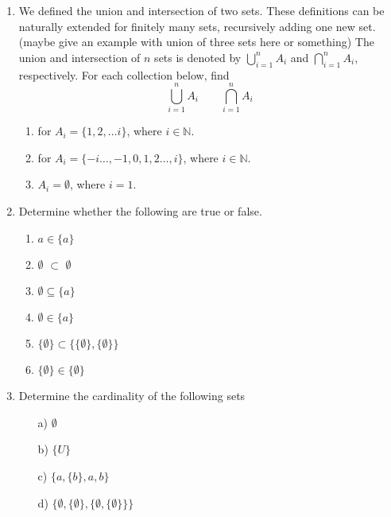 \documentclass{article}
\begin{document}
\begin{enumerate}
    \item
    We defined the union and intersection of two sets. These definitions can be naturally extended for finitely many sets, recursively adding one new set. (maybe give an example with union of three sets here or something) The union and intersection of $n$ sets is denoted by $\bigcup_{i = 1}^{n} A_{i}$ and $\bigcap_{i = 1}^{n} A_{i}$, respectively.
    For each collection below, find $$\bigcup_{i = 1}^{n} A_{i} \qquad \bigcap_{i = 1}^{n} A_{i}$$
    \begin{enumerate}
        \item for $A_{i} = \{1, 2, \dots i\}$, where $i \in \mathbb{N}$.
        \item for $A_{i} = \{-i \dots, -1, 0, 1, 2 \dots, i\}$, where $i \in \mathbb{N}$.
        \item $A_{i} = \emptyset$, where $i = 1$.
    \end{enumerate}
    
    \item Determine whether the following are true or false.
        \begin{enumerate}
            \item $a \in \{a\}$
            \item $\emptyset$ $\subset$ $\emptyset$
            \item $\emptyset \subseteq \{a\}$
            \item $\emptyset \in \{a\}$
            \item $\{\emptyset\} \subset \{\{\emptyset\}, \{\emptyset\}\}$
            \item $\{\emptyset\} \in \{\emptyset\}$
        \end{enumerate}
        
    \item Determine the cardinality of the following sets
        \begin{enumerate}
            \item[a)] $\emptyset$
            
            \item[b)] $\{U\}$
            
            \item[c)] $\{a,\{b\}, a, b\}$
            
            \item[d)] $\{\emptyset,\{\emptyset\},\{\emptyset,\{\emptyset\}\}\}$
        
        \end{enumerate}
        

\end{enumerate}
\end{document}
